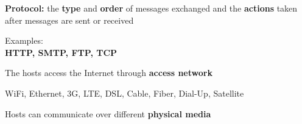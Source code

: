 \begin{frame}
\begin{center}
\large
\textbf{Protocol:} the \textbf{type} and \textbf{order} of messages exchanged and the \textbf{actions} taken after messages are sent or received
\end{center}
\end{frame}

\begin{frame}
\begin{center}
\large
Examples:\\
\textbf{HTTP, SMTP, FTP, TCP}
\end{center}
\end{frame}

\begin{frame}
\begin{center}
\large
The hosts access the Internet through \textbf{access network}
\end{center}
\end{frame}

\begin{frame}\begin{center}
\large
WiFi, Ethernet, 3G, LTE, DSL, Cable, Fiber, Dial-Up, Satellite
\end{center}\end{frame}

\begin{frame}
\begin{center}
\large
Hosts can communicate over different \textbf{physical media}
\end{center}
\end{frame}

\begin{frame}[plain]\begin{center}
\end{center}\end{frame}

